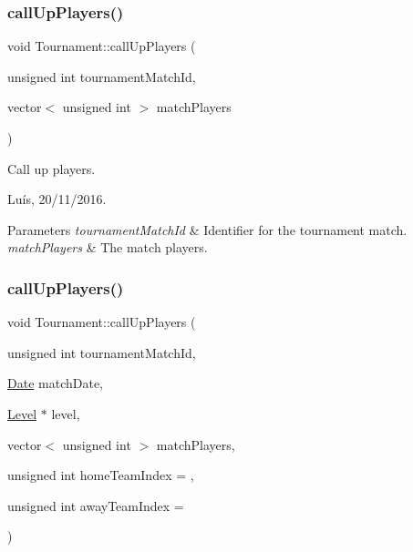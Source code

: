 \subsubsection{\texorpdfstring{call\+Up\+Players()}{callUpPlayers()}\hspace{0.1cm}{\footnotesize\ttfamily [1/2]}}
{\footnotesize\ttfamily void Tournament\+::call\+Up\+Players (\begin{DoxyParamCaption}\item[{unsigned int}]{tournament\+Match\+Id,  }\item[{vector$<$ unsigned int $>$}]{match\+Players }\end{DoxyParamCaption})}



Call up players. 

Luís, 20/11/2016. 


\begin{DoxyParams}{Parameters}
{\em tournament\+Match\+Id} & Identifier for the tournament match. \\
\hline
{\em match\+Players} & The match players. \\
\hline
\end{DoxyParams}
\hypertarget{class_tournament_a15948a541a1675213e52381c6a67f51c}{}\label{class_tournament_a15948a541a1675213e52381c6a67f51c} 
\subsubsection{\texorpdfstring{call\+Up\+Players()}{callUpPlayers()}\hspace{0.1cm}{\footnotesize\ttfamily [2/2]}}
{\footnotesize\ttfamily void Tournament\+::call\+Up\+Players (\begin{DoxyParamCaption}\item[{unsigned int}]{tournament\+Match\+Id,  }\item[{\hyperlink{class_date}{Date}}]{match\+Date,  }\item[{\hyperlink{class_level}{Level} $\ast$}]{level,  }\item[{vector$<$ unsigned int $>$}]{match\+Players,  }\item[{unsigned int}]{home\+Team\+Index = {},  }\item[{unsigned int}]{away\+Team\+Index = {} }\end{DoxyParamCaption})}



